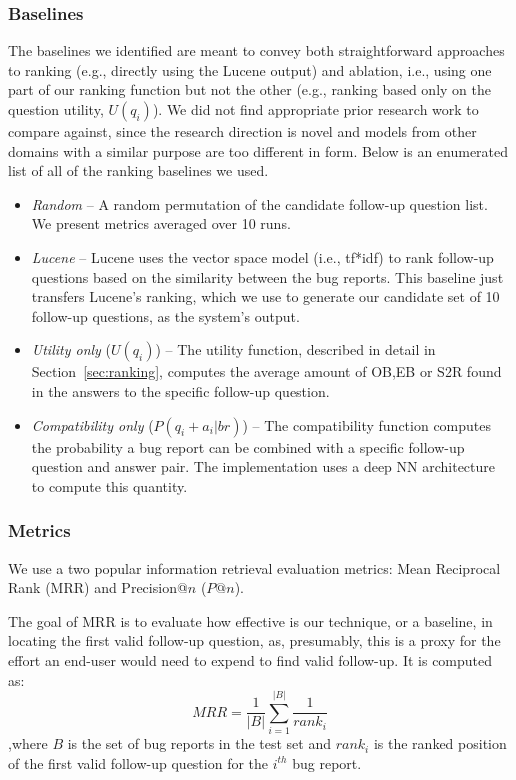 \subsubsection{Baselines}
The baselines we identified are meant to convey both straightforward approaches to ranking (e.g., directly using the Lucene output) and
ablation, i.e., using one part of our ranking function but not the other (e.g., ranking based only on the question utility, $U(q_{i})$).
We did not find appropriate prior research work to compare against, since the research direction is novel and models from other domains
with a similar purpose are too different in form. Below is an enumerated list of all of the ranking baselines we used.
\begin{itemize}
\item {\em Random} -- A random permutation of the candidate follow-up question list. We present metrics averaged over 10 runs.
\item {\em Lucene} -- Lucene uses the vector space model (i.e., tf*idf) to rank follow-up questions based on the similarity between the bug reports. This baseline just transfers Lucene's ranking, which we use to generate our candidate set of 10 follow-up questions, as the system's output.
\item {\em Utility only} ($U(q_{i})$) -- The utility function, described in detail in Section~\ref{sec:ranking}, computes the average amount of OB,EB or S2R found in the answers to the specific follow-up question.
\item {\em Compatibility only} ($P(q_{i}+a_{i}|br)$) -- The compatibility function computes the probability a bug report can be combined with a specific follow-up question and answer pair. The implementation uses a deep NN architecture to compute this quantity.
\end{itemize}

\subsubsection{Metrics}
We use a two popular information retrieval evaluation metrics: Mean Reciprocal Rank (MRR) and Precision@$n$ ($P@n$).

The goal of MRR is to evaluate how effective is our technique, or a baseline, in locating the first valid follow-up question, as, presumably, this is a proxy for the effort an end-user would need to expend to find valid follow-up. It is
computed as: $$MRR = \frac{1}{|B|} \sum_{i=1}^{|B|} \frac{1}{rank_{i}}$$ ,where $B$ is the set of bug reports in the test set and $rank_{i}$ is the ranked position of the first valid follow-up question for the $i^{th}$ bug report.

